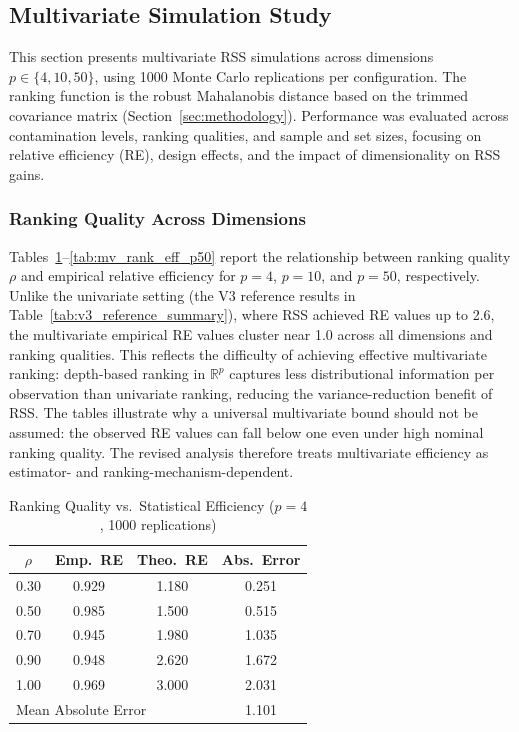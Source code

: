 \documentclass[12pt]{article}
\begin{document}
\subsection{Multivariate Simulation Study}
\label{subsec:multivariate_simulation}

This section presents multivariate RSS simulations across dimensions $p \in \{4, 10, 50\}$, using 1000 Monte Carlo replications per configuration. The ranking function is the robust Mahalanobis distance based on the trimmed covariance matrix (Section~\ref{sec:methodology}). Performance was evaluated across contamination levels, ranking qualities, and sample and set sizes, focusing on relative efficiency (RE), design effects, and the impact of dimensionality on RSS gains.

\subsubsection{Ranking Quality Across Dimensions}

Tables~\ref{tab:mv_rank_eff_p4}--\ref{tab:mv_rank_eff_p50} report the relationship between ranking quality $\rho$ and empirical relative efficiency for $p = 4$, $p = 10$, and $p = 50$, respectively. Unlike the univariate setting (the V3 reference results in Table~\ref{tab:v3_reference_summary}), where RSS achieved RE values up to 2.6, the multivariate empirical RE values cluster near 1.0 across all dimensions and ranking qualities. This reflects the difficulty of achieving effective multivariate ranking: depth-based ranking in $\mathbb{R}^p$ captures less distributional information per observation than univariate ranking, reducing the variance-reduction benefit of RSS. The tables illustrate why a universal multivariate bound should not be assumed: the observed RE values can fall below one even under high nominal ranking quality. The revised analysis therefore treats multivariate efficiency as estimator- and ranking-mechanism-dependent.

\begin{table}[htbp]
\centering
\caption{Ranking Quality vs.\ Statistical Efficiency ($p = 4$, 1000 replications)}
\label{tab:mv_rank_eff_p4}
\begin{tabular}{cccc}
\toprule
$\rho$ & Emp.\ RE & Theo.\ RE & Abs.\ Error \\
\midrule
0.30 & 0.929 & 1.180 & 0.251 \\
0.50 & 0.985 & 1.500 & 0.515 \\
0.70 & 0.945 & 1.980 & 1.035 \\
0.90 & 0.948 & 2.620 & 1.672 \\
1.00 & 0.969 & 3.000 & 2.031 \\
\midrule
\multicolumn{3}{l}{Mean Absolute Error} & 1.101 \\
\bottomrule
\end{tabular}
\end{table}
\end{document}
